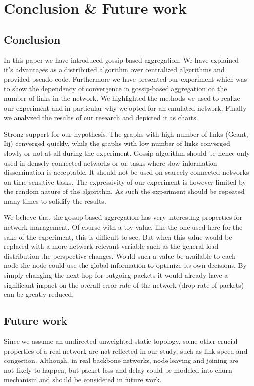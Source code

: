 \section{Conclusion \& Future work}
\label{sec:conclusion}

\subsection{Conclusion}
In this paper we have introduced gossip-based aggregation. We have explained it's advantages as a distributed algorithm over centralized algorithms and provided pseudo code. Furthermore we have presented our experiment which was to show the dependency of convergence in gossip-based aggregation on the number of links in the network. We highlighted the methods we used to realize our experiment and in particular why we opted for an emulated network. Finally we analyzed the results of our research and depicted it as charts.

Strong support for our hypothesis. The graphs with high number of links (Geant, Iij) converged quickly, while the graphs with low number of links converged slowly or not at all during the experiment. Gossip algorithm should be hence only used in densely connected networks or on tasks where slow information dissemination is acceptable. It should not be used on scarcely connected networks on time sensitive tasks. The expressivity of our experiment is however limited by the random nature of the algorithm. As such the experiment should be repeated many times to solidify the results.

We believe that the gossip-based aggregation has very interesting properties for network management. Of course with a toy value, like the one used here for the sake of the experiment, this is difficult to see. But when this value would be replaced with a more network relevant variable such as the general load distribution the perspective changes. Would such a value be available to each node the node could use the global information to optimize its own decisions. By simply changing the next-hop for outgoing packets it would already have a significant impact on the overall error rate of the network (drop rate of packets) can be greatly reduced.

\subsection{Future work}
Since we assume an undirected unweighted static topology, some other crucial properties of a real network are not reflected in our study, such as link speed and congestion. Although, in real backbone networks, node leaving and joining are not likely to happen, but packet loss and delay could be modeled into churn mechanism and should be considered in future work.\\

